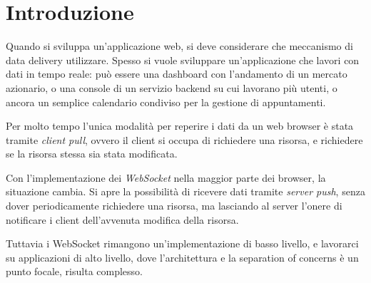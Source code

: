\documentclass[12pt,a4paper,openright,twoside]{report}
\newcommand\blankpage{%
    \null
    \thispagestyle{empty}%
    \addtocounter{page}{-1}%
    \newpage}
\begin{document}
\afterpage{\blankpage}

\linespread{1.3}

\normalsize
\clearpage{\pagestyle{empty}\cleardoublepage}
\tableofcontents

\listoffigures
{}


\chapter*{Introduzione}
Quando si sviluppa un’applicazione web, si deve considerare che meccanismo di data delivery utilizzare. Spesso si vuole sviluppare un’applicazione che lavori con dati in tempo reale: può essere una dashboard con l’andamento di un mercato azionario, o una console di un servizio backend su cui lavorano più utenti, o ancora un semplice calendario condiviso per la gestione di appuntamenti.

\bigskip

Per molto tempo l’unica modalità per reperire i dati da un web browser è stata tramite \textit{client pull}, ovvero il client si occupa di richiedere una risorsa, e richiedere se la risorsa stessa sia stata modificata.

\bigskip

Con l’implementazione dei \textit{WebSocket} nella maggior parte dei browser, la situazione cambia. Si apre la possibilità di ricevere dati tramite \textit{server push}, senza dover periodicamente richiedere una risorsa, ma lasciando al server l’onere di notificare i client dell’avvenuta modifica della risorsa.

\bigskip

Tuttavia i WebSocket rimangono un’implementazione di basso livello, e lavorarci su applicazioni di alto livello, dove l’architettura e la separation of concerns è un punto focale, risulta complesso.
\end{document}

